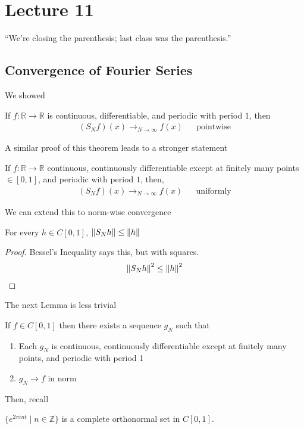 \section{Lecture 11}
``We're closing the parenthesis; last class was the parenthesis.''

\subsection{Convergence of Fourier Series}
We showed
\begin{lemma}
    If $f: \mathbb{R} \to \mathbb{R}$ is continuous, differentiable, and periodic with period $1$, then
    \begin{align}
        (S_Nf)(x) \to_{N \to \infty} f(x) && \text{pointwise}
    \end{align}
\end{lemma}
A similar proof of this theorem leads to a stronger statement
\begin{lemma}
    If $f: \mathbb{R} \to \mathbb{R}$ continuous, continuously differentiable except at finitely many points $\in [0,1]$, and periodic with period $1$, then,
    \begin{align}
        (S_Nf)(x) \to_{N\to\infty} f(x) && \text{uniformly}
    \end{align}
\end{lemma}
We can extend this to norm-wise convergence
\begin{lemma}
    For every $h \in C[0,1]$, $\norm{S_Nh} \le \norm{h}$
    \begin{proof}
        Bessel's Inequality says this, but with squares.
        \begin{align}
            \norm{S_Nh}^2 \le \norm{h}^2
        \end{align}
    \end{proof}
\end{lemma}
The next Lemma is less trivial
\begin{lemma}
    If $f \in C[0,1]$ then there exists a sequence $g_N$ such that
    \begin{enumerate}
        \item Each $g_N$ is continuous, continuously differentiable except at finitely many points, and periodic with period 1
        \item $g_N \to f$ in norm
    \end{enumerate}
\end{lemma}
Then, recall
\begin{theorem}
    $\{ e^{2\pi int} \mid n \in \mathbb{Z} \}$ is a complete orthonormal set in $C[0,1]$.
\end{theorem}
